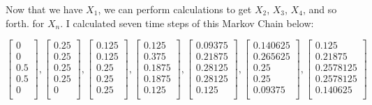 \documentclass[12pt,final]{article}
\begin{document}
Now that we have $X_1$, we can perform calculations to get $X_2$, $X_3$, $X_4$, and so forth. for $X_n$. I
calculated seven time steps of this Markov Chain below:

\begin{equation*}
\begin{bmatrix}
		0 \\
		0 \\
		0.5 \\
		0.5 \\
		0 \\
\end{bmatrix},
\begin{bmatrix}
		0.25 \\
		0.25 \\
		0.25 \\
		0.25 \\
		0 \\
\end{bmatrix},
\begin{bmatrix}
		0.125 \\
		0.125 \\
		0.25 \\
		0.25 \\
		0.25 \\
\end{bmatrix},
\begin{bmatrix}
		0.125 \\
		0.375 \\
		0.1875 \\
		0.1875 \\
		0.125 \\
\end{bmatrix},
\begin{bmatrix}
		0.09375 \\
		0.21875 \\
		0.28125 \\
		0.28125 \\
		0.125 \\
\end{bmatrix},
\begin{bmatrix}
		0.140625 \\
		0.265625 \\
		0.25 \\
		0.25 \\
		0.09375 \\
\end{bmatrix},
\begin{bmatrix}
		0.125 \\
		0.21875 \\
		0.2578125 \\
		0.2578125 \\
		0.140625 \\
\end{bmatrix}
\end{equation*}
\end{document}
